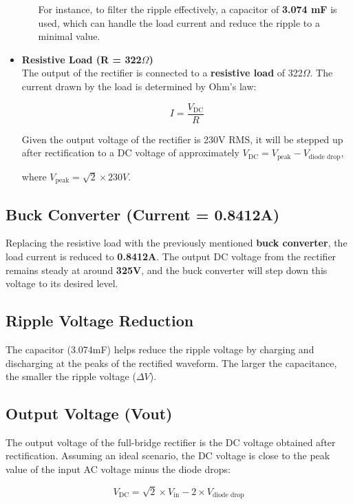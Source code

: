 \documentclass[12pt]{article}
\begin{document}
\begin{itemize}
\begin{itemize}
        For instance, to filter the ripple effectively, a capacitor of \textbf{3.074 mF} is used, which can handle the load current and reduce the ripple to a minimal value.
        \end{itemize}

    \item \textbf{Resistive Load (R = 322$\Omega$)} \\
    The output of the rectifier is connected to a \textbf{resistive load} of 322$\Omega$. The current drawn by the load is determined by Ohm’s law:

    \[
    I = \frac{V_{\text{DC}}}{R}
    \]

    Given the output voltage of the rectifier is 230V RMS, it will be stepped up after rectification to a DC voltage of approximately \( V_{\text{DC}} = V_{\text{peak}} - V_{\text{diode drop}} \),

    where \( V_{\text{peak}} = \sqrt{2} \times 230V \).
\end{itemize}

  \subsection*{Buck Converter (Current = 0.8412A)}
    Replacing the resistive load with the previously mentioned \textbf{buck converter}, the load current is reduced to \textbf{0.8412A}. The output DC voltage from the rectifier remains steady at around \textbf{325V}, and the buck converter will step down this voltage to its desired level.

  \subsection*{Ripple Voltage Reduction}
    The capacitor (3.074mF) helps reduce the ripple voltage by charging and discharging at the peaks of the rectified waveform. The larger the capacitance, the smaller the ripple voltage (\(\Delta V\)).

    \subsection*{Output Voltage (Vout)}
    The output voltage of the full-bridge rectifier is the DC voltage obtained after rectification. Assuming an ideal scenario, the DC voltage is close to the peak value of the input AC voltage minus the diode drops:

    \[
    V_{\text{DC}} = \sqrt{2} \times V_{\text{in}} - 2 \times V_{\text{diode drop}}
    \]
\end{document}
